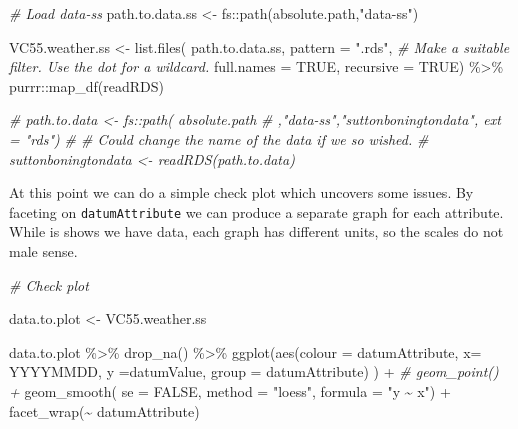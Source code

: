\documentclass{article}
\newenvironment{Shaded}{\begin{snugshade}}{\end{snugshade}}
\newcommand{\AttributeTok}[1]{\textcolor[rgb]{0.77,0.63,0.00}{#1}}
\newcommand{\CommentTok}[1]{\textcolor[rgb]{0.56,0.35,0.01}{\textit{#1}}}
\newcommand{\ConstantTok}[1]{\textcolor[rgb]{0.00,0.00,0.00}{#1}}
\newcommand{\FunctionTok}[1]{\textcolor[rgb]{0.00,0.00,0.00}{#1}}
\newcommand{\NormalTok}[1]{#1}
\newcommand{\OtherTok}[1]{\textcolor[rgb]{0.56,0.35,0.01}{#1}}
\newcommand{\SpecialCharTok}[1]{\textcolor[rgb]{0.00,0.00,0.00}{#1}}
\newcommand{\StringTok}[1]{\textcolor[rgb]{0.31,0.60,0.02}{#1}}
\begin{document}
\begin{Shaded}
\begin{Highlighting}[]
\CommentTok{\# Load data{-}ss}
\NormalTok{path.to.data.ss }\OtherTok{\textless{}{-}}\NormalTok{ fs}\SpecialCharTok{::}\FunctionTok{path}\NormalTok{(absolute.path,}\StringTok{"data{-}ss"}\NormalTok{)}

\NormalTok{VC55.weather.ss }\OtherTok{\textless{}{-}} \FunctionTok{list.files}\NormalTok{(}
\NormalTok{  path.to.data.ss,}
  \AttributeTok{pattern =} \StringTok{".rds"}\NormalTok{, }\CommentTok{\# Make a suitable filter. Use the dot for a wildcard.}
  \AttributeTok{full.names =} \ConstantTok{TRUE}\NormalTok{,}
  \AttributeTok{recursive =} \ConstantTok{TRUE}\NormalTok{)  }\SpecialCharTok{\%\textgreater{}\%}
\NormalTok{  purrr}\SpecialCharTok{::}\FunctionTok{map\_df}\NormalTok{(readRDS) }

\CommentTok{\# path.to.data \textless{}{-} fs::path( absolute.path}
\CommentTok{\#                                ,"data{-}ss","suttonboningtondata", ext = "rds")}
\CommentTok{\# \# Could change the name of the data if we so wished.}
\CommentTok{\# suttonboningtondata \textless{}{-}  readRDS(path.to.data)}
\end{Highlighting}
\end{Shaded}

At this point we can do a simple check plot which uncovers some issues. By faceting on \texttt{datumAttribute} we can produce a separate graph for each attribute. While is shows we have data, each graph has different units, so the scales do not male sense.

\begin{Shaded}
\begin{Highlighting}[]
\CommentTok{\# Check plot}

\NormalTok{data.to.plot }\OtherTok{\textless{}{-}}\NormalTok{ VC55.weather.ss}

\NormalTok{data.to.plot }\SpecialCharTok{\%\textgreater{}\%} \FunctionTok{drop\_na}\NormalTok{() }\SpecialCharTok{\%\textgreater{}\%}
\FunctionTok{ggplot}\NormalTok{(}\FunctionTok{aes}\NormalTok{(}\AttributeTok{colour =}\NormalTok{ datumAttribute, }\AttributeTok{x=}\NormalTok{ YYYYMMDD, }\AttributeTok{y =}\NormalTok{datumValue, }\AttributeTok{group =}\NormalTok{ datumAttribute) ) }\SpecialCharTok{+} 
 \CommentTok{\# geom\_point() +}
  \FunctionTok{geom\_smooth}\NormalTok{( }\AttributeTok{se =} \ConstantTok{FALSE}\NormalTok{, }\AttributeTok{method =} \StringTok{"loess"}\NormalTok{, }\AttributeTok{formula =} \StringTok{"y \textasciitilde{} x"}\NormalTok{) }\SpecialCharTok{+}
  \FunctionTok{facet\_wrap}\NormalTok{(}\SpecialCharTok{\textasciitilde{}}\NormalTok{ datumAttribute)}
\end{Highlighting}
\end{Shaded}
\end{document}
